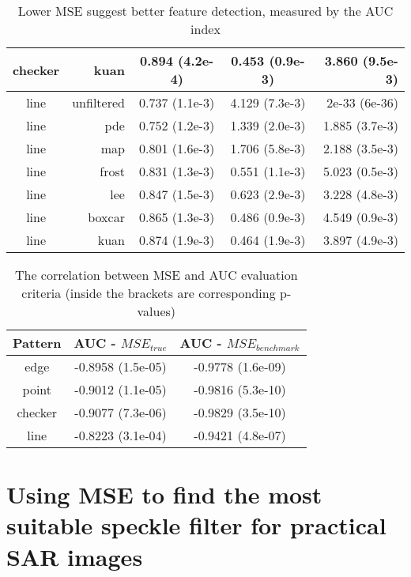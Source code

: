 \documentclass[journal]{IEEEtran}
\begin{document}
\begin{table}
\begin{tabular}{c|r|c|c|r}
 checker  &  kuan  &  0.894 (4.2e-4)  &  0.453 (0.9e-3)  &  3.860 (9.5e-3)\\
\hline
 line  &  unfiltered  &  0.737 (1.1e-3)  &  4.129 (7.3e-3)  &  2e-33 (6e-36)\\
 line  &  pde  &  0.752 (1.2e-3)  &  1.339 (2.0e-3)  &  1.885 (3.7e-3)\\
 line  &  map  &  0.801 (1.6e-3)  &  1.706 (5.8e-3)  &  2.188 (3.5e-3)\\
 line  &  frost  &  0.831 (1.3e-3)  &  0.551 (1.1e-3)  &  5.023 (0.5e-3)\\
 line  &  lee  &  0.847 (1.5e-3)  &  0.623 (2.9e-3)  &  3.228 (4.8e-3)\\
 line  &  boxcar  &  0.865 (1.3e-3)  &  0.486 (0.9e-3)  &  4.549 (0.9e-3)\\
 line  &  kuan  &  0.874 (1.9e-3)  &  0.464 (1.9e-3)  &  3.897 (4.9e-3)\\
\hline
\end{tabular}

\caption{Lower MSE suggest better feature detection, measured by the AUC index}
\label{tab:mse_auc_in_log_domain}
\end{table}

\begin{table}
\centering
\begin{tabular}{c|c|c}
Pattern  & AUC - $MSE_{true}$  & AUC - $MSE_{benchmark}$  \\
\hline
edge & -0.8958 (1.5e-05) &   -0.9778  (1.6e-09) \\
point &     -0.9012   (1.1e-05)   &    -0.9816        (5.3e-10) \\
checker &   -0.9077     (7.3e-06)  &  -0.9829       (3.5e-10) \\
line &      -0.8223     (3.1e-04)  &   -0.9421       (4.8e-07) \\
\hline
\end{tabular}

\caption{The correlation between MSE and AUC evaluation criteria (inside the brackets are corresponding p-values)}
\label{tab:mse_auc_corr_coeff}
\end{table}

\section{Using MSE to find the most suitable speckle filter for practical SAR images}
\label{sec:practical_conjecture}
\end{document}
